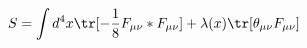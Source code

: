 \begin{equation} 
 S= \int d^4x \tr[- \frac{1}{8}F_{\mu \nu}*F_{\mu \nu}]+ \lambda(x) 
\tr[\theta_{\mu \nu}F_{\mu \nu}] \label{30} 
\end{equation} 
